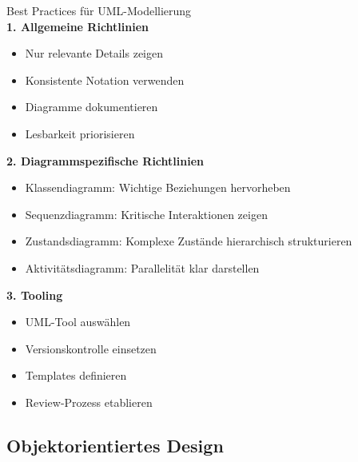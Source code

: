 
\begin{KR}{Best Practices für UML-Modellierung}\\
\textbf{1. Allgemeine Richtlinien}
\begin{itemize}
    \item Nur relevante Details zeigen
    \item Konsistente Notation verwenden
    \item Diagramme dokumentieren
    \item Lesbarkeit priorisieren
\end{itemize}

\textbf{2. Diagrammspezifische Richtlinien}
\begin{itemize}
    \item Klassendiagramm: Wichtige Beziehungen hervorheben
    \item Sequenzdiagramm: Kritische Interaktionen zeigen
    \item Zustandsdiagramm: Komplexe Zustände hierarchisch strukturieren
    \item Aktivitätsdiagramm: Parallelität klar darstellen
\end{itemize}

\textbf{3. Tooling}
\begin{itemize}
    \item UML-Tool auswählen
    \item Versionskontrolle einsetzen
    \item Templates definieren
    \item Review-Prozess etablieren
\end{itemize}
\end{KR}

\subsection{Objektorientiertes Design}

